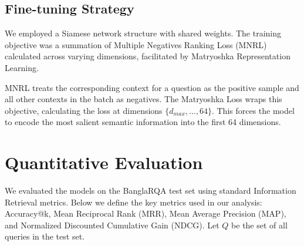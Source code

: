 \documentclass[manuscript,screen,review]{acmart}
\begin{document}
\subsection{Fine-tuning Strategy}
We employed a Siamese network structure with shared weights. The training objective was a summation of Multiple Negatives Ranking Loss (MNRL) calculated across varying dimensions, facilitated by Matryoshka Representation Learning.

MNRL treats the corresponding context for a question as the positive sample and all other contexts in the batch as negatives. The Matryoshka Loss wraps this objective, calculating the loss at dimensions $\{d_{max}, \dots, 64\}$. This forces the model to encode the most salient semantic information into the first 64 dimensions.

\section{Quantitative Evaluation}

We evaluated the models on the BanglaRQA test set using standard Information Retrieval metrics. Below we define the key metrics used in our analysis: Accuracy@k, Mean Reciprocal Rank (MRR), Mean Average Precision (MAP), and Normalized Discounted Cumulative Gain (NDCG). Let $Q$ be the set of all queries in the test set.
\end{document}
